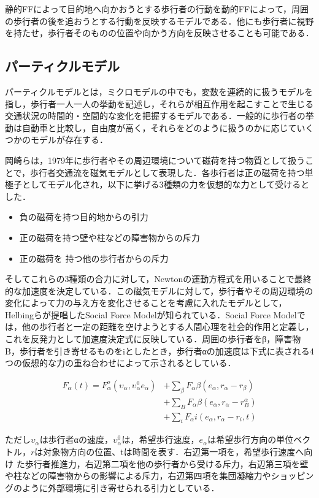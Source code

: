 静的FFによって目的地へ向かおうとする歩行者の行動を動的FFによって，周囲の歩行者の後を追おうとする行動を反映するモデルである．他にも歩行者に視野を持たせ，歩行者そのものの位置や向かう方向を反映させることも可能である．

\subsection{パーティクルモデル}

パーティクルモデルとは，ミクロモデルの中でも，変数を連続的に扱うモデルを指し，歩行者一人一人の挙動を記述し，それらが相互作用を起こすことで生じる交通状況の時間的・空間的な変化を把握するモデルである．一般的に歩行者の挙動は自動車と比較し，自由度が高く，それらをどのように扱うのかに応じていくつかのモデルが存在する．

岡崎らは，1979年に歩行者やその周辺環境について磁荷を持つ物質として扱うことで，歩行者交通流を磁気モデルとして表現した\cite{jiki_model}．各歩行者は正の磁荷を持つ単極子としてモデル化され，以下に挙げる3種類の力を仮想的な力として受けるとした．

\begin{itemize}
 \item 負の磁荷を持つ目的地からの引力
 \item 正の磁荷を持つ壁や柱などの障害物からの斥力
 \item 正の磁荷を 持つ他の歩行者からの斥力
\end{itemize}

そしてこれらの3種類の合力に対して，Newtonの運動方程式を用いることで最終的な加速度を決定している．この磁気モデルに対して，歩行者やその周辺環境の変化によって力の与え方を変化させることを考慮に入れたモデルとして，Helbingらが提唱したSocial Force Modelが知られている．Social Force Modelでは，他の歩行者と一定の距離を空けようとする人間心理を社会的作用と定義し，これを反発力として加速度決定式に反映している．周囲の歩行者をβ，障害物B，歩行者を引き寄せるものをiとしたとき，歩行者αの加速度は下式に表される4つの仮想的な力の重ね合わせによって示されるとしている．

\begin{equation}
\begin{split}
 F_α(t)=F_α^o(υ_α,υ_α^0e_α)&+\sum_{β}F_αβ(e_α,r_α-r_β)\\
 &+\sum_{B}F_αβ(e_α,r_α-r_B^α)\\
 &+\sum_{i}F_αi(e_α,r_α-r_i,t)
\end{split}
\end{equation}

ただし$υ_α$は歩行者αの速度，$υ_α^0$は，希望歩行速度，$e_α$は希望歩行方向の単位ベクトル，$r$は対象物方向の位置、tは時間を表す．右辺第一項を，希望歩行速度へ向け
た歩行者推進力，右辺第二項を他の歩行者から受ける斥力，右辺第三項を壁や柱などの障害物からの影響による斥力，右辺第四項を集団凝縮力やショッピングのように外部環境に引き寄せられる引力としている．

